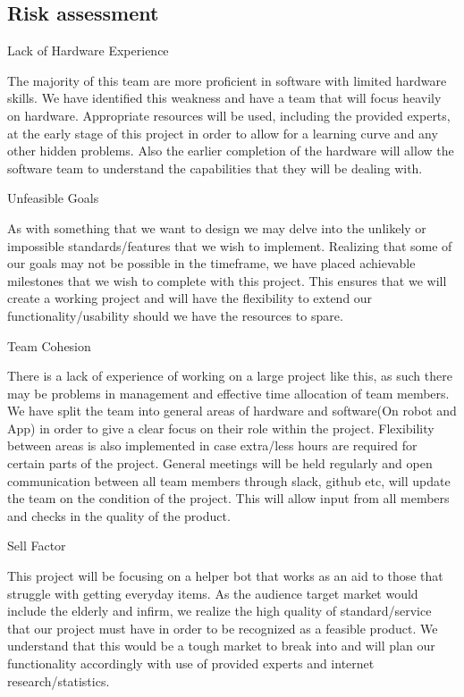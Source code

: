 \documentclass{article}
\begin{document}
\subsection{Risk assessment} 

Lack of Hardware Experience

The majority of this team are more proficient in software with limited hardware skills. We have identified this weakness and have a team that will focus heavily on hardware. Appropriate resources will be used, including the provided experts, at the early stage of this project in order to allow for a learning curve and any other hidden problems. Also the earlier completion of the hardware will allow the software team to understand the capabilities that they will be dealing with.

Unfeasible Goals

As with something that we want to design we may delve into the unlikely or impossible standards/features that we wish to implement. Realizing that some of our goals may not be possible in the timeframe, we have placed achievable milestones that we wish to complete with this project. This ensures that we will create a working project and will have the flexibility to extend our functionality/usability should we have the resources to spare.

Team Cohesion

There is a lack of experience of working on a large project like this, as such there may be problems in management and effective time allocation of team members. We have split the team into general areas of hardware and software(On robot and App) in order to give a clear focus on their role within the project. Flexibility between areas is also implemented in case extra/less hours are required for certain parts of the project. General meetings will be held regularly and open communication between all team members through slack, github etc, will update the team on the condition of the project. This will allow input from all members and checks in the quality of the product.

Sell Factor

This project will be focusing on a helper bot that works as an aid to those that struggle with getting everyday items. As the audience target market would include the elderly and infirm, we realize the high quality of standard/service that our project must have in order to be recognized as a feasible product. We understand that this would be a tough market to break into and will plan our functionality accordingly with use of provided experts and internet research/statistics.
\end{document}
